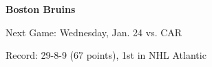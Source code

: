
\textbf{Boston Bruins}

Next Game: Wednesday, Jan. 24 vs. CAR

Record: 29-8-9 (67 points), 1st in NHL Atlantic 
